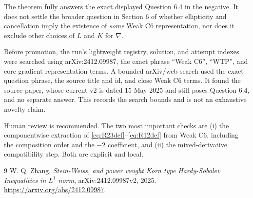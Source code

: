 \documentclass[11pt]{article}
\begin{document}
The theorem fully answers the exact displayed Question 6.4 in the negative.
It does not settle the broader question in Section 6 of whether ellipticity
and cancellation imply the existence of \emph{some} Weak C6 representation,
nor does it exclude other choices of \(L\) and \(K\) for \(\nabla\).

Before promotion, the run's lightweight registry, solution, and attempt
indexes were searched using arXiv:2412.09987, the exact phrase ``Weak C6'',
``WTP'', and core gradient-representation terms.  A bounded arXiv/web search
used the exact question phrase, the source title and id, and close Weak C6
terms.  It found the source paper, whose current v2 is dated 15 May 2025 and
still poses Question 6.4, and no separate answer.  This records the search
bounds and is not an exhaustive novelty claim.

Human review is recommended.  The two most important checks are (i) the
componentwise extraction of \eqref{eq:R23def}--\eqref{eq:R12def} from Weak C6,
including the composition order and the \(-2\) coefficient, and (ii) the
mixed-derivative compatibility step.  Both are explicit and local.

\begin{thebibliography}{9}
W. Q. Zhang,
\emph{Stein-Weiss, and power weight Korn type Hardy-Sobolev Inequalities in
\(L^1\) norm}, arXiv:2412.09987v2, 2025.
\url{https://arxiv.org/abs/2412.09987}.
\end{thebibliography}
\end{document}

